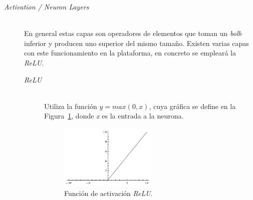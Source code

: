 \begin{description}
\vspace{15pt}	
\item[\textit{Activation / Neuron Layers}] \hfill  
\vspace{10pt}
\\
	En general estas capas son operadores de elementos que toman un \textit{bolb} inferior y producen uno superior del mismo tamaño. Existen varias capas con este funcionamiento en la plataforma, en concreto se empleará la \textit{\ac{ReLU}}.
	\vspace{10pt}
	\begin{description}
	\item[\textit{\ac{ReLU}}] \hfill  
	\vspace{5pt}
	\\
		Utiliza la función $y=max(0,x)$, cuya gráfica se define en la Figura~\ref{fig.reLu}, donde \textit{x} es la entrada a la neurona.
		\begin{figure}[H]
			\begin{center}
				\includegraphics[width=0.5\textwidth]{figures/relu.jpeg}
				\caption{Función de activación \textit{\ac{ReLU}}.}
				\label{fig.reLu}
			\end{center}
		\end{figure} 
	\end{description}
	

\end{description}
